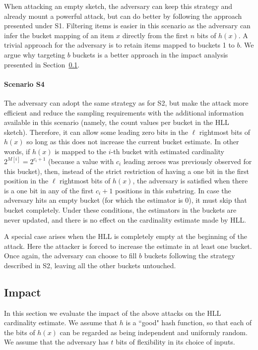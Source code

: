 \documentclass[11pt]{article}
\begin{document}
When attacking an empty sketch, the adversary can keep this strategy and already mount a powerful attack, but can do better by following the approach presented under S1. Filtering items is easier in this scenario as the adversary can infer the bucket mapping of an item $x$ directly from the first $n$ bits of $h(x)$. A trivial approach for the adversary is to retain items mapped to buckets 1 to $b$. We argue why targeting $b$ buckets is a better approach in the impact analysis presented in Section~\ref{sec:impact}. 

\noindent\paragraph{Scenario S4} The adversary can adopt the same strategy as for S2, but make the attack more efficient and reduce the sampling requirements with the additional information available in this scenario (namely, the count values per bucket in the HLL sketch). Therefore, it can allow some leading zero bits in the $\ell$ rightmost bits of $h(x)$ so long as this does not increase the current bucket estimate. In other words, if $h(x)$ is mapped to the $i$-th bucket with estimated cardinality $2^{M[i]}=2^{c_i + 1}$ (because a value with $c_i$ leading zeroes was previously observed for this bucket), then, instead of the strict restriction of having a one bit in the first position in the $\ell$ rightmost bits of $h(x)$, the adversary is satisfied when there is a one bit in any of the first $c_i+1$ positions in this substring. In case the adversary hits an empty bucket (for which the estimator is 0), it must skip that bucket completely. Under these conditions, the estimators in the buckets are never updated, and there is no effect on the cardinality estimate made by HLL.

A special case arises when the HLL is completely empty at the beginning of the attack. Here the attacker is forced to increase the estimate in at least one bucket. Once again, the adversary can choose to fill $b$ buckets following the strategy described in S2, leaving all the other buckets untouched.

\subsection{Impact}\label{sec:impact}
In this section we evaluate the impact of the above attacks on the HLL cardinality estimate. We assume that $h$ is a ``good" hash function, so that each of the bits of $h(x)$ can be regarded as being independent and uniformly random. We assume that the adversary has $t$ bits of flexibility in its choice of inputs.
\end{document}
